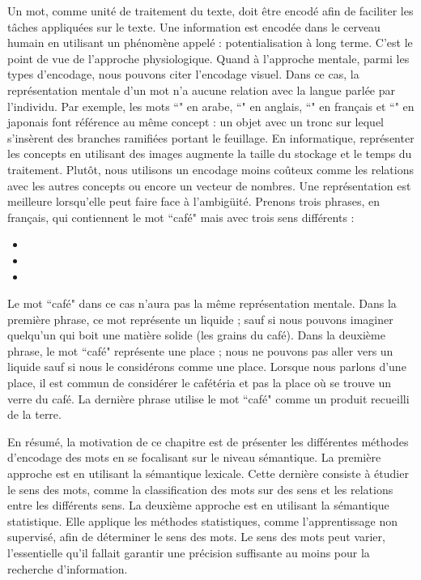 \documentclass{KodeBook}
\begin{document}
Un mot, comme unité de traitement du texte, doit être encodé afin de faciliter les tâches appliquées sur le texte. 
Une information est encodée dans le cerveau humain en utilisant un phénomène appelé : potentialisation à long terme. 
C'est le point de vue de l'approche physiologique.
Quand à l'approche mentale, parmi les types d'encodage, nous pouvons citer l'encodage visuel. 
Dans ce cas, la représentation mentale d'un mot n'a aucune relation avec la langue parlée par l'individu.
Par exemple, les mots ``" en arabe, ``" en anglais, ``" en français et ``" en japonais font référence au même concept : un objet avec un tronc sur lequel s'insèrent des branches ramifiées portant le feuillage.
En informatique, représenter les concepts en utilisant des images augmente la taille du stockage et le temps du traitement. 
Plutôt, nous utilisons un encodage moins coûteux comme les relations avec les autres concepts ou encore un vecteur de nombres.
Une représentation est meilleure lorsqu'elle peut faire face à l'ambigüité. 
Prenons trois phrases, en français, qui contiennent le mot ``café" mais avec trois sens différents : 
\begin{itemize}
	\item {}
	\item {}
	\item {}
\end{itemize}
Le mot ``café" dans ce cas n'aura pas la même représentation mentale. 
Dans la première phrase, ce mot représente un liquide ; sauf si nous pouvons imaginer quelqu'un qui boit une matière solide (les grains du café). 
Dans la deuxième phrase, le mot ``café" représente une place ; nous ne pouvons pas aller vers un liquide sauf si nous le considérons comme une place. 
Lorsque nous parlons d'une place, il est commun de considérer le cafétéria et pas la place où se trouve un verre du café.
La dernière phrase utilise le mot ``café" comme un produit recueilli de la terre.

En résumé, la motivation de ce chapitre est de présenter les différentes méthodes d'encodage des mots en se focalisant sur le niveau sémantique.
La première approche est en utilisant la sémantique lexicale.
Cette dernière consiste à étudier le sens des mots, comme la classification des mots sur des sens et les relations entre les différents sens.
La deuxième approche est en utilisant la sémantique statistique.
Elle applique les méthodes statistiques, comme l'apprentissage non supervisé, afin de déterminer le sens des mots.
Le sens des mots peut varier, l'essentielle qu'il fallait garantir une précision suffisante au moins pour la recherche d'information.
\end{document}
